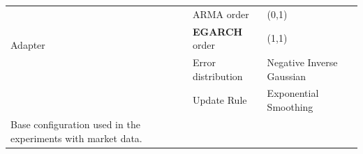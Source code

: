 \documentclass[10pt,a4paper,oneside]{article}
\providecommand{\DIFdeltex}[1]{{\protect\color{red} \scriptsize #1}} %
\providecommand{\DIFdelbegin}{} %
\providecommand{\DIFdelend}{} %
\providecommand{\DIFdel}[1]{\texorpdfstring{\DIFdeltex{#1}}{}} %
\newcommand{\DIFscaledelfig}{0.5}
\newlength{\DIFdelgraphicswidth} %
\newlength{\DIFdelgraphicsheight} %
\newcommand{\DIFdelincludegraphics}[2][]{%
\sbox{\DIFdelgraphicsbox}{\DIFOincludegraphics[#1]{#2}}%
\settoboxwidth{\DIFdelgraphicswidth}{\DIFdelgraphicsbox} %
\settoboxtotalheight{\DIFdelgraphicsheight}{\DIFdelgraphicsbox} %
\scalebox{\DIFscaledelfig}{%
\parbox[b]{\DIFdelgraphicswidth}{\usebox{\DIFdelgraphicsbox}\\[-\baselineskip] \rule{\DIFdelgraphicswidth}{0em}}\llap{\resizebox{\DIFdelgraphicswidth}{\DIFdelgraphicsheight}{%
\setlength{\unitlength}{\DIFdelgraphicswidth}%
\begin{picture}(1,1)%
\thicklines\linethickness{2pt} %
{\color[rgb]{1,0,0}\put(0,0){\framebox(1,1){}}}%
{\color[rgb]{1,0,0}\put(0,0){\line( 1,1){1}}}%
{\color[rgb]{1,0,0}\put(0,1){\line(1,-1){1}}}%
\end{picture}%
}\hspace*{3pt}}} %
} %
\DeclareRobustCommand{\DIFdelbegin}{\DIFOdelbegin \let\includegraphics\DIFdelincludegraphics} %
\DeclareRobustCommand{\DIFdelend}{\DIFOaddend \let\includegraphics\DIFOincludegraphics} %
\begin{document}
\begin{longtable}{@{}lll@{}}
\multirow{3}{*}{Adapter} 
 & ARMA order & (0,1) \\
 & \textbf{EGARCH} order & (1,1) \\
 & Error distribution & Negative Inverse Gaussian \\ 
 & Update Rule & Exponential Smoothing \\ \midrule
\DIFdelbegin %
{%
\DIFdel{Base configuration used in the experiments with market data.}} 
\DIFdelend \end{longtable}


\begingroup
\small %
\setlength{\tabcolsep}{3pt} %
\end{document}
